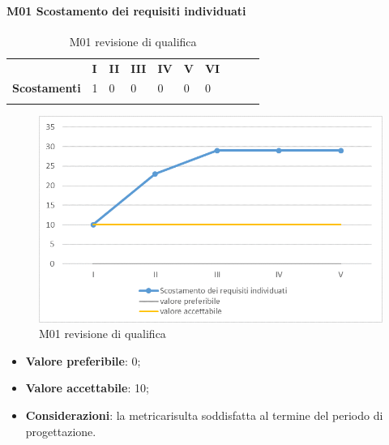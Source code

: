 \paragraph{M01 Scostamento dei requisiti individuati} \mbox{}
\begin{longtable}[H!] {						
		>{}p{50mm}  		
		>{}p{8mm}
		>{}p{8mm}		
		>{}p{8mm}		
		>{}p{8mm}		
		>{}p{8mm}		
		>{}p{8mm}
		>{}p{8mm}
		>{}p{8mm}
		>{}p{8mm}
	}
	\rowcolor{gray!50}
	\textbf{} & \textbf{I} & \textbf{II} & \textbf{III} & \textbf{IV} & \textbf{V} & \textbf{VI} \TBstrut \\ [2mm]
	\textbf{Scostamenti} & 1 & 0 & 0 & 0 & 0 & 0 \TBstrut \\ [2mm]
	\rowcolor{white}
	\caption{M01 revisione di qualifica}
\end{longtable}
\begin{figure}[H] 	
	\includegraphics[width=\linewidth]{./img/grafici/RP1.png}	
	\caption{M01 revisione di qualifica}	
\end{figure}
\begin{itemize}
	\item \textbf{Valore preferibile}: 0;
	\item \textbf{Valore accettabile}: 10;
	\item \textbf{Considerazioni}: la metrica\glosp risulta soddisfatta al termine del periodo di progettazione\glo.
\end{itemize}

